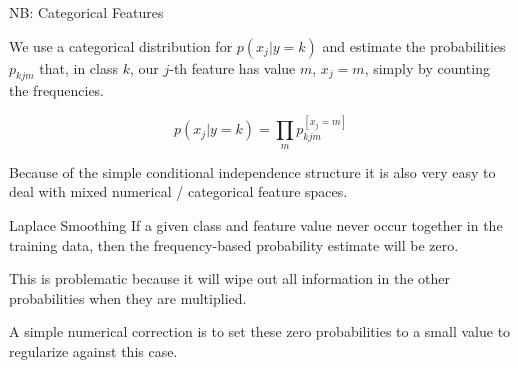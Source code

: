 \begin{vbframe}{NB: Categorical Features}

  We use a categorical distribution for $p(x_j | y = k)$ and estimate the probabilities $p_{kjm}$ that, in class $k$, our $j$-th feature has value $m$, $x_j = m$, simply by counting the frequencies.

$$
p(x_j | y = k) = \prod_m p_{kjm}^{[x_j = m]}
$$
%
%


Because of the simple conditional independence structure it is also very easy to deal with mixed numerical / categorical feature spaces.

\end{vbframe}






\begin{vbframe}{Laplace Smoothing}
If a given class and feature value never occur together in the training data, then the frequency-based probability estimate will be zero.

\lz

This is problematic because it will wipe out all information in the other probabilities when they are multiplied.

\lz
%
A simple numerical correction is to set these zero probabilities to a small value to regularize against this case.


\end{vbframe}



